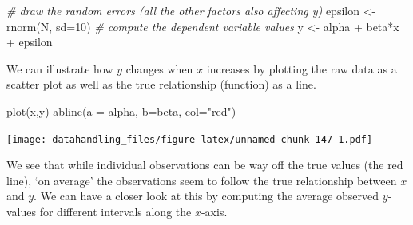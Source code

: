 \documentclass[
  12pt,
]{style/krantz}
\newenvironment{Shaded}{\begin{snugshade}}{\end{snugshade}}
\newcommand{\AttributeTok}[1]{\textcolor[rgb]{0.77,0.63,0.00}{#1}}
\newcommand{\CommentTok}[1]{\textcolor[rgb]{0.56,0.35,0.01}{\textit{#1}}}
\newcommand{\DecValTok}[1]{\textcolor[rgb]{0.00,0.00,0.81}{#1}}
\newcommand{\FunctionTok}[1]{\textcolor[rgb]{0.00,0.00,0.00}{#1}}
\newcommand{\NormalTok}[1]{#1}
\newcommand{\OtherTok}[1]{\textcolor[rgb]{0.56,0.35,0.01}{#1}}
\newcommand{\SpecialCharTok}[1]{\textcolor[rgb]{0.00,0.00,0.00}{#1}}
\newcommand{\StringTok}[1]{\textcolor[rgb]{0.31,0.60,0.02}{#1}}
\begin{document}
\begin{Shaded}
\begin{Highlighting}[]
\CommentTok{\# draw the random errors (all the other factors also affecting y)}
\NormalTok{epsilon }\OtherTok{\textless{}{-}} \FunctionTok{rnorm}\NormalTok{(N, }\AttributeTok{sd=}\DecValTok{10}\NormalTok{)}
\CommentTok{\# compute the dependent variable values}
\NormalTok{y }\OtherTok{\textless{}{-}}\NormalTok{ alpha }\SpecialCharTok{+}\NormalTok{ beta}\SpecialCharTok{*}\NormalTok{x }\SpecialCharTok{+}\NormalTok{ epsilon}
\end{Highlighting}
\end{Shaded}

We can illustrate how \(y\) changes when \(x\) increases by plotting the raw data as a scatter plot as well as the true relationship (function) as a line.

\begin{Shaded}
\begin{Highlighting}[]
\FunctionTok{plot}\NormalTok{(x,y)}
\FunctionTok{abline}\NormalTok{(}\AttributeTok{a =}\NormalTok{ alpha, }\AttributeTok{b=}\NormalTok{beta, }\AttributeTok{col=}\StringTok{"red"}\NormalTok{)}
\end{Highlighting}
\end{Shaded}

\texttt{[image: datahandling\_files/figure-latex/unnamed-chunk-147-1.pdf]}

We see that while individual observations can be way off the true values (the red line), `on average' the observations seem to follow the true relationship between \(x\) and \(y\). We can have a closer look at this by computing the average observed \(y\)-values for different intervals along the \(x\)-axis.
\end{document}
